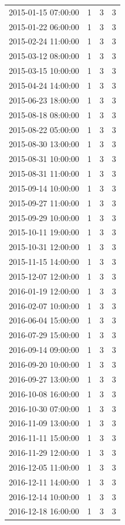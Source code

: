 \begin{tabular}{lrrr}
2015-01-15 07:00:00 & 1 & 3 & 3 \\
2015-01-22 06:00:00 & 1 & 3 & 3 \\
2015-02-24 11:00:00 & 1 & 3 & 3 \\
2015-03-12 08:00:00 & 1 & 3 & 3 \\
2015-03-15 10:00:00 & 1 & 3 & 3 \\
2015-04-24 14:00:00 & 1 & 3 & 3 \\
2015-06-23 18:00:00 & 1 & 3 & 3 \\
2015-08-18 08:00:00 & 1 & 3 & 3 \\
2015-08-22 05:00:00 & 1 & 3 & 3 \\
2015-08-30 13:00:00 & 1 & 3 & 3 \\
2015-08-31 10:00:00 & 1 & 3 & 3 \\
2015-08-31 11:00:00 & 1 & 3 & 3 \\
2015-09-14 10:00:00 & 1 & 3 & 3 \\
2015-09-27 11:00:00 & 1 & 3 & 3 \\
2015-09-29 10:00:00 & 1 & 3 & 3 \\
2015-10-11 19:00:00 & 1 & 3 & 3 \\
2015-10-31 12:00:00 & 1 & 3 & 3 \\
2015-11-15 14:00:00 & 1 & 3 & 3 \\
2015-12-07 12:00:00 & 1 & 3 & 3 \\
2016-01-19 12:00:00 & 1 & 3 & 3 \\
2016-02-07 10:00:00 & 1 & 3 & 3 \\
2016-06-04 15:00:00 & 1 & 3 & 3 \\
2016-07-29 15:00:00 & 1 & 3 & 3 \\
2016-09-14 09:00:00 & 1 & 3 & 3 \\
2016-09-20 10:00:00 & 1 & 3 & 3 \\
2016-09-27 13:00:00 & 1 & 3 & 3 \\
2016-10-08 16:00:00 & 1 & 3 & 3 \\
2016-10-30 07:00:00 & 1 & 3 & 3 \\
2016-11-09 13:00:00 & 1 & 3 & 3 \\
2016-11-11 15:00:00 & 1 & 3 & 3 \\
2016-11-29 12:00:00 & 1 & 3 & 3 \\
2016-12-05 11:00:00 & 1 & 3 & 3 \\
2016-12-11 14:00:00 & 1 & 3 & 3 \\
2016-12-14 10:00:00 & 1 & 3 & 3 \\
2016-12-18 16:00:00 & 1 & 3 & 3 \\

\end{tabular}
